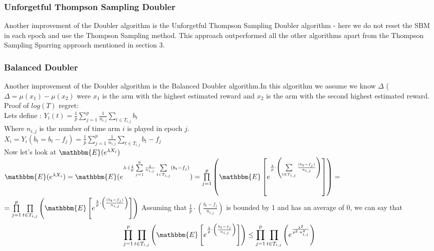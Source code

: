 \documentclass{llncs}
\begin{document}
				
	\subsubsection{Unforgetful Thompson Sampling Doubler}
		Another improvement of the Doubler algorithm is the Unforgetful Thompson Sampling Doubler algorithm - here we do not reset the SBM in each epoch and use the Thompson Sampling method. This approach outperformed all the other algorithms apart from the Thompson Sampling Sparring approach mentioned in section 3.

		
		
		\newpage	
	\subsubsection{Balanced Doubler}
		Another improvement of the Doubler algorithm is the Balanced Doubler algorithm.In this algorithm we assume we know $\Delta$ ($\Delta = \mu(x_1) - \mu(x_2)$ were $x_1$ is the arm with the highest estimated reward and $x_2$ is the arm with the second highest estimated reward.
		\\
		Proof of $log(T)$ regret:
		\\
		Lets define : $Y_i(t) = \frac{1}{p}\sum\limits_{j=1}^{p}\frac{1}{n_{i,j}}
						   \sum\limits_{t\in T_{i,j}} b_t$		
		\\
		Where $n_{i,j}$ is the number of time arm $i$ is played in epoch $j$.\\
		$X_i = Y_i (b_t = b_t- f_j) =   \frac{1}{p}\sum\limits_{j=1}^{p}\frac{1}{n_{i,j}}
						   \sum\limits_{t\in T_{i,j}} b_t-f_j$	
		\\
		Now let's look at $\mathbbm{E}(e^{\lambda X_i})$
		\\	
		$\mathbbm{E}(e^{\lambda X_i}) = \mathbbm{E}(e^{\lambda\cdot(
		\frac{1}{p}\sum\limits_{j=1}^{p}\frac{1}{n_{i,j}}
						   \sum\limits_{t\in T_{i,j}}( b_t-f_j
						   )}) =						      	   
						   \prod\limits_{j=1}^{p}
						   \left(
						   \mathbbm{E}\left[e^{\frac{\lambda}{p}\cdot\left(
						   	   \sum\limits_{t\in T_{i,j}}
						   	   		\frac{(b_t-f_j)}{n_{i,j}}
						\right)}\right]
						   \right)=
						   $		
						   \\
						   $ =						      	   
						   \prod\limits_{j=1}^{p}
						   \prod\limits_{t\in T_{i,j}}
						   \left(
						   \mathbbm{E}\left[e^{\frac{\lambda}
						   {p}\cdot\left(
						   	   		\frac{(b_t-f_j)}
						   	   		{n_{i,j}}\right)}
						   	   		\right]
						   \right)$
		Assuming that $\frac{1}{p}\cdot\left(\frac{b_t-f_j}
		{n_{i,j}}\right) $ is bounded by 1 and has an average of 0, we can say that
		\\
		$$ \prod\limits_{j=1}^{p}
						   \prod\limits_{t\in T_{i,j}}
						   \left(
						   \mathbbm{E}\left[e^{\frac{\lambda}
						   {p}\cdot\left(
						   	   		\frac{b_t-f_j}
						   	   		{n_{i,j}}\right)}
						   	   		\right]
						   \right) \leq
						   \prod\limits_{j=1}^{p}
						   \prod\limits_{t\in T_{i,j}}
						   \left(
						   e^{\frac{\lambda^2}{p^2\cdot n^2_{i,j}}}
						   \right)
						   $$
						   
\end{document}
